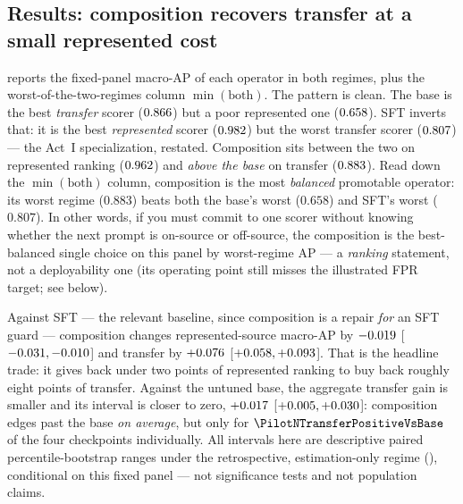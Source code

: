 \subsection{Results: composition recovers transfer at a small represented cost}
\label{sec:actIII-results}

 reports the fixed-panel macro-AP of each operator in both regimes, plus
the worst-of-the-two-regimes column $\min(\text{both})$. The pattern is clean. The base is the
best \emph{transfer} scorer ($0.866$) but a poor represented one
($0.658$). SFT inverts that: it is the best \emph{represented} scorer
($0.982$) but the worst transfer scorer ($0.807$) --- the Act~I
specialization, restated. Composition sits between the two on represented ranking
($0.962$) and \emph{above the base} on transfer
($0.883$). Read down the $\min(\text{both})$ column, composition is the most
\emph{balanced} promotable operator: its worst regime ($0.883$) beats both the base's worst
($0.658$) and SFT's worst ($0.807$). In other words, if you must commit to one scorer without
knowing whether the next prompt is on-source or off-source, the composition is the best-balanced single
choice on this panel by worst-regime AP --- a \emph{ranking} statement, not a deployability one (its
operating point still misses the illustrated FPR target; see below).



Against SFT --- the relevant baseline, since composition is a repair \emph{for} an SFT guard ---
composition changes represented-source macro-AP by $-0.019$
[$-0.031,-0.010$] and transfer by $+0.076$
[$+0.058,+0.093$]. That is the headline trade: it gives
back under two points of represented ranking to buy back roughly eight points of transfer.
Against the untuned base, the aggregate transfer gain is smaller and its interval is closer to
zero, $+0.017$ [$+0.005,+0.030$]:
composition edges past the base \emph{on average}, but only for $\PilotNTransferPositiveVsBase$ of
the four checkpoints individually. All intervals here are descriptive paired percentile-bootstrap
ranges under the retrospective, estimation-only regime (\PilotEvidenceStatus{}), conditional on
this fixed panel --- not significance tests and not population claims.

